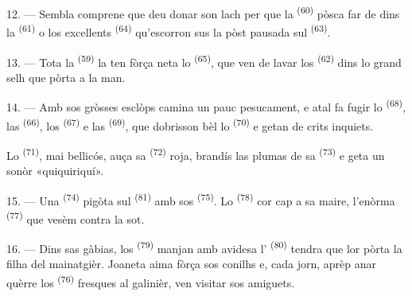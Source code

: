 12. --- Sembla comprene que deu donar son lach per que la 
\textsuperscript{(60)} pòsca far de  dins la 
\textsuperscript{(61)} o los excellents 
\textsuperscript{(64)} qu'escorron sus la pòst pausada sul 
\textsuperscript{(63)}.

13. --- Tota la  \textsuperscript{(59)} la ten fòrça neta lo
 \textsuperscript{(65)}, que ven de lavar los  \textsuperscript{(62)} dins lo grand selh que pòrta a la man.

\VUsaut{3.0mm}
\VUsaut{3.0mm}

14. --- Amb sos gròsses esclòps camina un pauc pesucament, e atal fa fugir lo
 \textsuperscript{(68)}, las  \textsuperscript{(66)},
los  \textsuperscript{(67)} e las 
\textsuperscript{(69)}, que dobrisson bèl lo  \textsuperscript{(70)} e
getan de crits inquiets.

Lo  \textsuperscript{(71)}, mai bellicós, auça sa 
\textsuperscript{(72)} roja, brandís las plumas de sa 
\textsuperscript{(73)} e geta un sonòr «quiquiriquí».

15. --- Una  \textsuperscript{(74)} pigòta sul 
\textsuperscript{(81)} amb sos  \textsuperscript{(75)}. Lo
 \textsuperscript{(78)} cor cap a sa maire, l'enòrma
 \textsuperscript{(77)} que vesèm contra la sot.

16. --- Dins sas gàbias, los  \textsuperscript{(79)} manjan amb
avidesa l' \textsuperscript{(80)} tendra que lor pòrta la filha del
mainatgièr. Joaneta aima fòrça sos conilhs e, cada jorn, aprèp anar quèrre los
 \textsuperscript{(76)} fresques al galinièr, ven visitar sos
amiguets.
\VUsaut{6.0mm}
\VUfilet{22mm}
